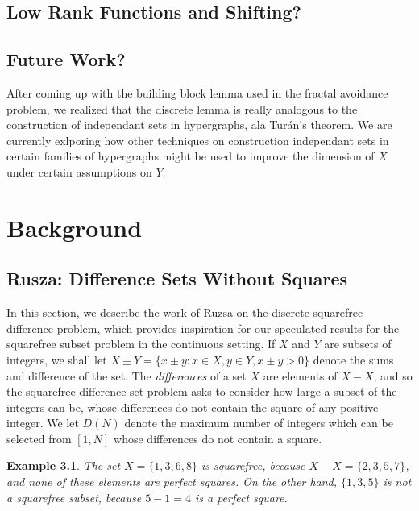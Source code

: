 \documentclass{report}
\theoremstyle{plain}
\newtheorem*{example}{Example}
\theoremstyle{plain}
\begin{document}
\section{Low Rank Functions and Shifting?}

\section{Future Work?}

After coming up with the building block lemma used in the fractal avoidance problem, we realized that the discrete lemma is really analogous to the construction of independant sets in hypergraphs, ala Tur\'{a}n's theorem. We are currently exlporing how other techniques on construction independant sets in certain families of hypergraphs might be used to improve the dimension of $X$ under certain assumptions on $Y$.

\chapter{Background}

\section{Rusza: Difference Sets Without Squares}

In this section, we describe the work of Ruzsa on the discrete squarefree difference problem, which provides inspiration for our speculated results for the squarefree subset problem in the continuous setting. If $X$ and $Y$ are subsets of integers, we shall let $X \pm Y = \{ x \pm y: x \in X, y \in Y, x \pm y > 0 \}$ denote the sums and difference of the set. The {\it differences} of a set $X$ are elements of $X - X$, and so the squarefree difference set problem asks to consider how large a subset of the integers can be, whose differences do not contain the square of any positive integer. We let $D(N)$ denote the maximum number of integers which can be selected from $[1,N]$ whose differences do not contain a square.

\begin{example}
    The set $X = \{ 1, 3, 6, 8 \}$ is squarefree, because $X - X = \{ 2, 3, 5, 7 \}$, and none of these elements are perfect squares. On the other hand, $\{ 1, 3, 5 \}$ is not a squarefree subset, because $5 - 1 = 4$ is a perfect square.
\end{example}
\end{document}
